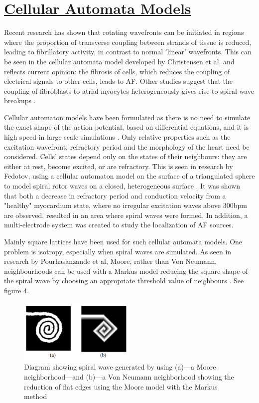 \documentclass[twocolumn]{article}
\begin{document}
\section{\textbf{\underline{Cellular Automata Models}}}

Recent research has shown that rotating wavefronts can be initiated in regions where the proportion of transverse coupling between strands of tissue is reduced, leading to fibrillatory activity, in contrast to normal 'linear' wavefronts. This can be seen in the cellular automata model developed by Christensen et al. and reflects current opinion: the fibrosis of cells, which reduces the coupling of electrical signals to other cells, leads to AF\cite{Christensen}. Other studies suggest that the coupling of fibroblasts to atrial myocytes heterogeneously gives rise to spiral wave breakups \cite{Ozawa}.


Cellular automaton models have been formulated as there is no need to simulate the exact shape of the action potential, based on differential equations, and it is high speed in large scale simulations \cite{Felipe}. Only relative properties such as the excitation wavefront, refractory period and the morphology of the heart need be considered. Cells' states depend only on the states of their neighbours: they are either at rest, become excited, or are refractory. This is seen in research by Fedotov, using a cellular automaton model on the surface of a triangulated sphere to model spiral rotor waves on a closed, heterogeneous surface \cite{Fedotov}. It was shown that both a decrease in refractory period and conduction velocity from a "healthy" myocardium state, where no irregular excitation waves above 300bpm are observed, resulted in an area where spiral waves were formed. In addition, a multi-electrode system was created to study the localization of AF sources. 


Mainly square lattices have been used for such cellular automata models. One problem is isotropy, especially when spiral waves are simulated. As seen in research by Pourhasanzande et al, Moore, rather than Von Neumann, neighbourhoods can be used with a Markus model reducing the square shape of the spiral wave by choosing an appropriate threshold value of neighbours \cite{Pour}. See figure 4.


\begin{figure}
\caption[short title]{Diagram showing spiral wave generated by using (a)---a Moore neighborhood---and (b)---a Von
Neumann neighborhood showing the reduction of flat edges using the Moore model with the Markus method
 \cite{Pour}}
\centering
\includegraphics[width = 0.5\textwidth]{flatedgered}
\end{figure}
\end{document}
